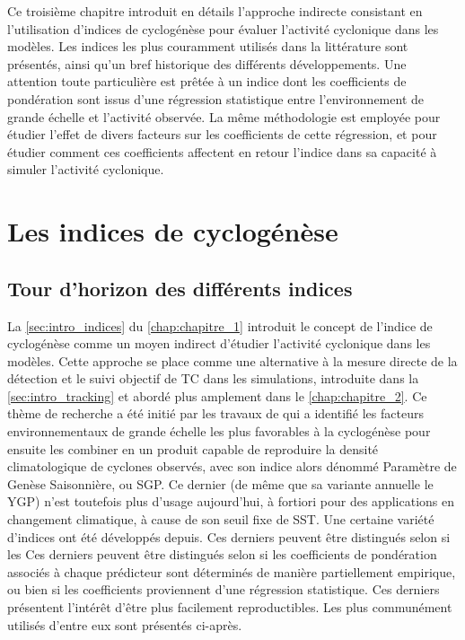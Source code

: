 \documentclass[../main.tex]{subfiles}
\begin{document}
\begin{itshape}
    Ce troisième chapitre introduit en détails l'approche indirecte consistant en l'utilisation d'indices de cyclogénèse pour évaluer l'activité cyclonique dans
    les modèles. Les indices les plus couramment utilisés dans la littérature sont présentés, ainsi qu'un bref historique des différents développements. Une
    attention toute particulière est prêtée à un indice dont les coefficients de pondération sont issus d'une régression statistique entre l'environnement de
    grande échelle et l'activité observée. La même méthodologie est employée pour étudier l'effet de divers facteurs sur les coefficients de cette régression,
    et pour étudier comment ces coefficients affectent en retour l'indice dans sa capacité à simuler l'activité cyclonique.
\end{itshape}

\minitoc
\newpage
\section{Les indices de cyclogénèse}\label{sec:intro_chap3}

\subsection{Tour d'horizon des différents indices}\label{sec:tour_horizon_indices}

La \cref{sec:intro_indices} du \cref{chap:chapitre_1} introduit le concept de l'indice de cyclogénèse comme un moyen indirect d'étudier l'activité cyclonique
dans les modèles. Cette approche se place comme une alternative à la mesure directe de la détection et le suivi objectif de TC dans les simulations, introduite
dans la \cref{sec:intro_tracking} et abordé plus amplement dans le \cref{chap:chapitre_2}. Ce thème de recherche a été initié par les travaux de
\textcite{gray_global_1968,gray_tropical_1975} qui a identifié les facteurs environnementaux de grande échelle les plus favorables à la cyclogénèse pour ensuite
les combiner en un produit capable de reproduire la densité climatologique de cyclones observés, avec son indice alors dénommé Paramètre de Genèse Saisonnière,
ou SGP. Ce dernier (de même que sa variante annuelle le YGP) n'est toutefois plus d'usage aujourd'hui, à fortiori pour des applications en changement
climatique, à cause de son seuil fixe de SST. Une certaine variété d'indices ont été développés depuis. Ces derniers peuvent être distingués selon si les Ces
derniers peuvent être distingués selon si les coefficients de pondération associés à chaque prédicteur sont déterminés de manière partiellement empirique, ou
bien si les coefficients proviennent d'une régression statistique. Ces derniers présentent l'intérêt d'être plus facilement reproductibles. Les plus communément
utilisés d'entre eux sont présentés ci-après.
\end{document}
